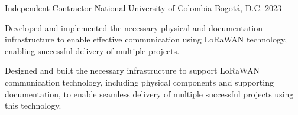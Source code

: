 


\begin{cventries}




\cventry
{Independent Contractor} %
{National University of Colombia} %
{Bogotá, D.C.} %
{2023} %
{ %
\begin{cvitems}
\item {Developed and implemented the necessary physical and documentation infrastructure to enable effective communication using LoRaWAN technology, enabling successful delivery of multiple projects.}
\item {Designed and built the necessary infrastructure to support LoRaWAN communication technology, including physical components and supporting documentation, to enable seamless delivery of multiple successful projects using this technology.}
\end{cvitems}
}



\end{cventries}
